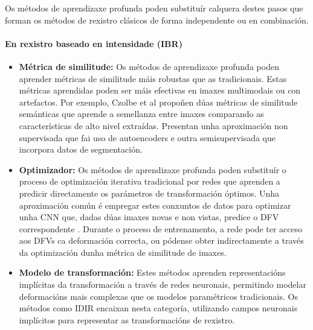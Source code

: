 Os métodos de aprendizaxe profunda poden substituír calquera destes pasos que forman os métodos de rexistro clásicos de forma independente ou en combinación.

\paragraph{En rexistro baseado en intensidade (IBR)}
\label{par:IBR_substitution}

\begin{itemize}
\item \textbf{Métrica de similitude:} Os métodos de aprendizaxe profunda poden aprender métricas de similitude máis robustas que as tradicionais. Estas métricas aprendidas poden ser máis efectivas en imaxes multimodais ou con artefactos.
Por exemplo, Czolbe et al \cite{semanticsimilarity} propoñen dúas métricas de similitude semánticas que aprende a semellanza entre imaxes comparando as características de alto nivel extraídas. Presentan unha aproximación non supervisada que fai uso de autoencoders e outra semisupervisada que incorpora datos de segmentación.
\item \textbf{Optimizador:} Os métodos de aprendizaxe profunda poden substituír o proceso de optimización iterativa tradicional por redes que aprenden a predicir directamente os parámetros de transformación óptimos. Unha aproximación común é empregar estes conxuntos de datos para optimizar unha CNN que, dadas dúas imaxes novas e non vistas, predice o DFV correspondente \cite{defregcnn}. Durante o proceso de entrenamento, a rede pode ter acceso aos DFVs ca deformación correcta, ou pódense obter indirectamente a través da optimización dunha métrica de similitude de imaxes.
\item \textbf{Modelo de transformación:} Estes métodos aprenden representacións implícitas da transformación a través de redes neuronais, permitindo modelar deformacións mais complexas que os modelos paramétricos tradicionais. Os métodos como IDIR \cite{wolterink2021implicit} encaixan nesta categoría, utilizando campos neuronais implícitos para representar as transformacións de rexistro.
\end{itemize}



